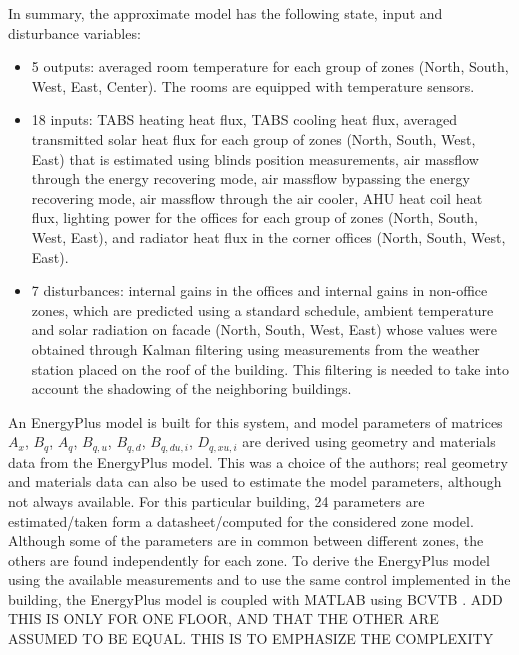 \textcolor[rgb]{0,0,1}{In summary, the approximate model has the following state, input and disturbance variables:
	\begin{itemize}
		\item 5 outputs: averaged room temperature for each group of zones (North, South, West, East, Center). The rooms are equipped with temperature sensors.
		\item 18 inputs: TABS heating heat flux, TABS cooling heat flux, averaged transmitted solar heat flux for each group of zones (North, South, West, East) that is estimated using blinds position measurements, air massflow through the energy recovering mode, air massflow bypassing the energy recovering mode, air massflow through the air cooler, AHU heat coil heat flux, lighting power for the offices for each group of zones (North, South, West, East), and radiator heat flux in the corner offices (North, South, West, East).
		\item 7 disturbances: internal gains in the offices and internal gains in non-office zones, which are predicted using a standard schedule, ambient temperature and solar radiation on facade (North, South, West, East) whose values were obtained through Kalman filtering using measurements from the weather station placed on the roof of the building. This filtering is needed to take into account the shadowing of the neighboring buildings.
	\end{itemize}
An EnergyPlus model is built for this system, and model parameters of matrices $A_x$, $B_q$, $A_q$, $B_{q,u}$, $B_{q,d}$, $B_{q,du,i}$, $D_{q,xu,i}$ are derived using geometry and materials data from the EnergyPlus model.
This was a choice of the authors; real geometry and materials data can also be used to estimate the model parameters, although not always available. 
For this particular building, 24 parameters are estimated/taken form a datasheet/computed for the considered zone model.
Although some of the parameters are in common between different zones, the others are found independently for each zone.
To derive the EnergyPlus model using the available measurements and to use the same control implemented in the building, the EnergyPlus model is coupled with MATLAB using BCVTB \cite{Wetter2015}.\textcolor[rgb]{1,0,0}{ ADD THIS IS ONLY FOR ONE FLOOR, AND THAT THE OTHER ARE ASSUMED TO BE EQUAL. THIS IS TO EMPHASIZE THE COMPLEXITY}}

